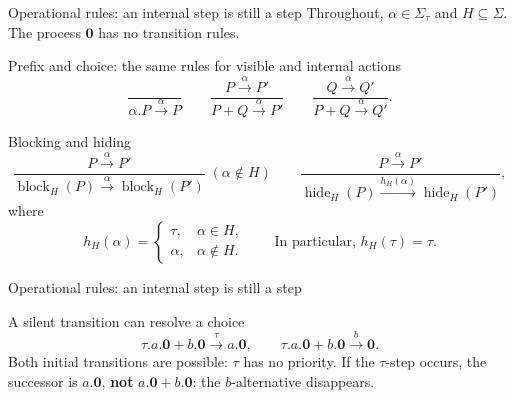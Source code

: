 \documentclass[handout,aspectratio=169,11pt]{beamer}
\newcommand{\step}[1]{\xrightarrow{#1}}
\newcommand{\nil}{\mathbf 0}
\newcommand{\blockact}[2]{\operatorname{block}_{#1}(#2)}
\newcommand{\hide}[2]{\operatorname{hide}_{#1}(#2)}
\begin{document}
\begin{frame}{Operational rules: an internal step is still a step}
  Throughout, $\alpha\in\Sigma_\tau$ and $H\subseteq\Sigma$.
  The process $\nil$ has no transition rules.

  \begin{block}{Prefix and choice: the same rules for visible and internal actions}
    \[
      \frac{}{\alpha.P\step{\alpha}P}
      \qquad
      \frac{P\step{\alpha}P'}{P+Q\step{\alpha}P'}
      \qquad
      \frac{Q\step{\alpha}Q'}{P+Q\step{\alpha}Q'}.
    \]
  \end{block}

  \begin{block}{Blocking and hiding}
    \[
      \frac{P\step{\alpha}P'}
           {\blockact{H}{P}\step{\alpha}\blockact{H}{P'}}
      \;(\alpha\notin H)
      \qquad
      \frac{P\step{\alpha}P'}
           {\hide{H}{P}\step{h_H(\alpha)}\hide{H}{P'}},
    \]
    where
    \[
      h_H(\alpha)=
      \begin{cases}
        \tau,   & \alpha\in H,\\
        \alpha, & \alpha\notin H.
      \end{cases}
      \qquad\text{In particular, }h_H(\tau)=\tau.
    \]
  \end{block}

\end{frame}



\begin{frame}{Operational rules: an internal step is still a step}
 

  \begin{alertblock}{A silent transition can resolve a choice}
    \[
      \tau.a.\nil+b.\nil\step{\tau}a.\nil,
      \qquad
      \tau.a.\nil+b.\nil\step{b}\nil.
    \]
    Both initial transitions are possible: $\tau$ has no priority.
    If the $\tau$-step occurs, the successor is $a.\nil$,
    \textbf{not} $a.\nil+b.\nil$: the $b$-alternative disappears.
  \end{alertblock}
\end{frame}
\end{document}
